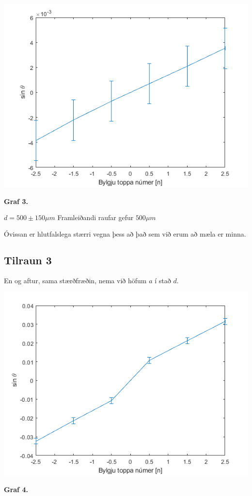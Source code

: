 \documentclass[12pt]{article}
\begin{document}
\begin{center}
    \includegraphics[scale=0.5]{html/data_03.png}
    
    \bf Graf 3.
\end{center}

$d = 500 \pm 150 \mu m$
Framleiðandi raufar gefur $500 \mu m$

Óvissan er hlutfalslega stærri vegna þess að það sem við erum að mæla er minna.


\subsection{Tilraun 3}

En og aftur, sama stærðfræðin, nema við höfum $a$ í stað $d$.

\begin{center}
    \includegraphics[scale=0.5]{html/data_04.png}
    
    \bf Graf 4.
\end{center}
\end{document}
